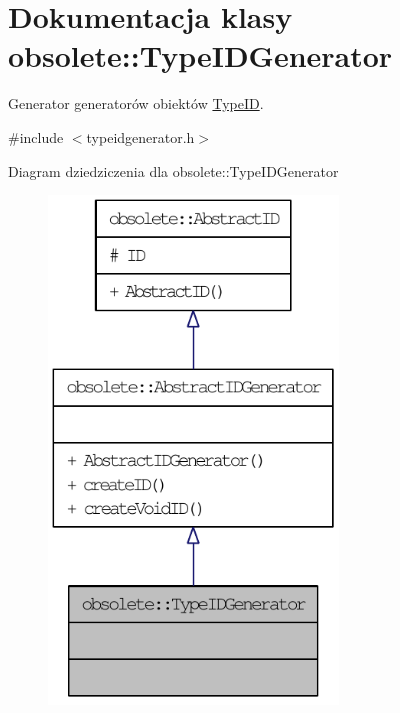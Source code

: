 \hypertarget{classobsolete_1_1TypeIDGenerator}{
\section{Dokumentacja klasy obsolete::TypeIDGenerator}
\label{classobsolete_1_1TypeIDGenerator}
}


Generator generatorów obiektów \hyperlink{classobsolete_1_1TypeID}{TypeID}.  




{\ttfamily \#include $<$typeidgenerator.h$>$}



Diagram dziedziczenia dla obsolete::TypeIDGenerator\nopagebreak
\begin{figure}[H]
\begin{center}
\leavevmode
\includegraphics[width=218pt]{classobsolete_1_1TypeIDGenerator__inherit__graph}
\end{center}
\end{figure}


